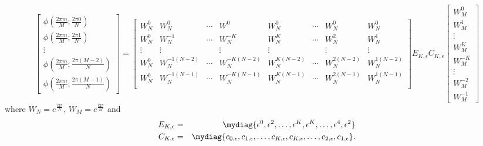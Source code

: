 \documentclass[a4paper,10pt]{article}
\begin{document}
\begin{equation}
\begin{bmatrix}
\phi(\tfrac{2\pi m}{M};\tfrac{2\pi 0}{N})\\
\phi(\tfrac{2\pi m}{M};\tfrac{2\pi 1}{N})\\
\vdots\\
\phi(\tfrac{2\pi m}{M};\tfrac{2\pi (M-2)}{N})\\
\phi(\tfrac{2\pi m}{M};\tfrac{2\pi (M-1)}{N})
\end{bmatrix}
= 
\begin{bmatrix}
W_N^{0}&W_N^{0}&\cdots&W^{0}&W_N^{0}&\cdots&W_N^{0}&W_N^{0}\\
W_N^{0}&W_N^{-1}&\cdots&W_N^{-K}&W_N^{K}&\cdots&W_N^2&W_N^1\\
\vdots&\vdots&&\vdots&\vdots&&\vdots&\vdots\\
W_N^0&W_N^{-1(N-2)}&\cdots&W_N^{-K(N-2)}&W_N^{K(N-2)}&\cdots&W_N^{2(N-2)}&W_N^{1(N-2)}\\
W_N^0&W_N^{-1(N-1)}&\cdots&W_N^{-K(N-1)}&W_N^{K(N-1)}&\cdots&W_N^{2(N-1)}&W_N^{1(N-1)}\\
\end{bmatrix}E_{K,\epsilon}C_{K,\epsilon}
\begin{bmatrix}
W_M^0\\
W_M^1\\
\vdots\\
W_M^K\\
W_M^{-K}\\
\vdots\\
W_M^{-2}\\
W_M^{-1}
\end{bmatrix}
\end{equation}
where  $W_N=e^{\frac{i2\pi}{N}}$, $W_M=e^{\frac{i2\pi}{M}}$ and 
\begin{eqnarray}
	E_{K,\epsilon} &=& 
	\mydiag\{\epsilon^0,\epsilon^2,\dots,\epsilon^K,\epsilon^{K},\dots,\epsilon^4,\epsilon^2\}\\
	C_{K,\epsilon} &=& \mydiag\{c_{0,\epsilon},c_{1,\epsilon},\dots,c_{K,\epsilon},c_{K,\epsilon},\dots,c_{2,\epsilon},c_{1,\epsilon}\}.
\end{eqnarray}
\end{document}
